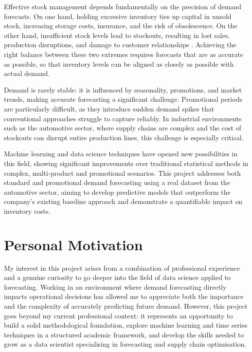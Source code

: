 \documentclass[ENG]{TFUOC}%
\begin{document}
Effective stock management depends fundamentally on the precision of demand forecasts. On one hand, holding excessive inventory ties up capital in unsold stock, increasing storage costs, insurance, and the risk of obsolescence. On the other hand, insufficient stock levels lead to stockouts, resulting in lost sales, production disruptions, and damage to customer relationships \citep{silver2016inventory, chopra2021supply}. Achieving the right balance between these two extremes requires forecasts that are as accurate as possible, so that inventory levels can be aligned as closely as possible with actual demand.

Demand is rarely stable: it is influenced by seasonality, promotions, and market trends, making accurate forecasting a significant challenge. Promotional periods are particularly difficult, as they introduce sudden demand spikes that conventional approaches struggle to capture reliably. In industrial environments such as the automotive sector, where supply chains are complex and the cost of stockouts can disrupt entire production lines, this challenge is especially critical.

Machine learning and data science techniques have opened new possibilities in this field, showing significant improvements over traditional statistical methods in complex, multi-product and promotional scenarios. This project addresses both standard and promotional demand forecasting using a real dataset from the automotive sector, aiming to develop predictive models that outperform the company's existing baseline approach and demonstrate a quantifiable impact on inventory costs.


\section{Personal Motivation}

My interest in this project arises from a combination of professional 
experience and a genuine curiosity to go deeper into the field of 
data science applied to forecasting. Working in an environment where 
demand forecasting directly impacts operational decisions has allowed 
me to appreciate both the importance and the complexity of accurately 
predicting future demand. However, this project goes beyond my current 
professional context: it represents an opportunity to build a solid 
methodological foundation, explore machine learning and time series 
techniques in a structured academic framework, and develop the skills 
needed to grow as a data scientist specialising in forecasting and 
supply chain optimisation.
\end{document}

